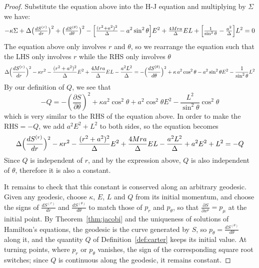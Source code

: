 \documentclass{article}
\theoremstyle{remark}
\begin{document}
\begin{proof}
Substitute the equation above into the H-J equation and multiplying by $\Sigma$ we have:
\begin{equation}
    -\kappa\Sigma
+ \Delta\bigl(\tfrac{dS^{(r)}}{dr}\bigr)^2 + \bigl(\tfrac{dS^{(\theta)}}{d\theta}\bigr)^2
- \Bigl[\tfrac{(r^2 + a^2)^2}{\Delta}- a^2\sin^2\theta\Bigr]E^2
+ \tfrac{4Mra}{\Delta}EL
+ \Bigl[\tfrac{1}{\sin^2\theta} - \tfrac{a^2}{\Delta}\Bigr]L^2
= 0
\end{equation}
The equation above only involves $r$ and $\theta$, so we rearrange the equation such that the LHS only involves $r$ while the RHS only involves $\theta$
\begin{equation}
    \Delta\Bigl(\frac{dS^{(r)}}{dr}\Bigr)^2- \kappa r^2
    - \frac{(r^2 + a^2)^2}{\Delta}E^2
    + \frac{4Mra}{\Delta}EL
    - \frac{a^2L^2}{\Delta}
    =
    -\Bigl(\frac{dS^{(\theta)}}{d\theta}\Bigr)^2
    + \kappa\,a^2\cos^2\theta
    - a^2\sin^2\theta E^2
    - \frac{1}{\sin^2\theta}L^2
\end{equation}
By our definition of $Q$, we see that 
\begin{equation}
    -Q = -(\frac{\partial S}{\partial \theta})^2 + \kappa a^2 \cos^2\theta + a^2\cos^2\theta E^2 -\frac{L^2}{\sin^2\theta}\cos^2\theta
\end{equation}
which is very similar to the RHS of the equation above. In order to make the RHS$=-Q$, we add $a^2E^2+L^2$ to both sides, so the equation becomes
\begin{equation}
    \Delta\Bigl(\frac{dS^{(r)}}{dr}\Bigr)^2
    -\kappa r^2
    -\frac{(r^2 + a^2)^2}{\Delta}E^2
    +\frac{4Mra}{\Delta}EL
    -\frac{a^2 L^2}{\Delta} +a^2 E^2 +L^2 = -Q
\end{equation}
Since $Q$ is independent of $r$, and by the expression above, $Q$ is also independent of $\theta$, therefore it is also a constant.

It remains to check that this constant is conserved along an arbitrary geodesic. Given any geodesic, choose $\kappa$, $E$, $L$ and $Q$ from its initial momentum, and choose the signs of $\frac{dS^{(r)}}{dr}$ and $\frac{dS^{(\theta)}}{d\theta}$ to match those of $p_r$ and $p_{\theta}$, so that $\frac{\partial S}{\partial x^{\mu}} = p_{\mu}$ at the initial point. By Theorem~\ref{thm:jacobi} and the uniqueness of solutions of Hamilton's equations, the geodesic is the curve generated by $S$, so $p_{\theta} = \frac{dS^{(\theta)}}{d\theta}$ along it, and the quantity $Q$ of Definition~\ref{def:carter} keeps its initial value. At turning points, where $p_r$ or $p_{\theta}$ vanishes, the sign of the corresponding square root switches; since $Q$ is continuous along the geodesic, it remains constant.
\end{proof}
\end{document}
